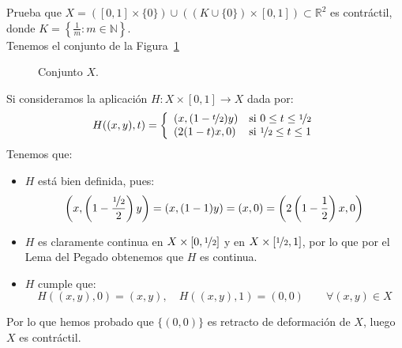 \begin{ejercicio}
    Prueba que $X=([0,1]\times \{0\})\cup ((K\cup \{0\})\times [0,1])\subset \mathbb{R}^2$ es contráctil, donde $K = \left\{\frac{1}{m}:m\in \mathbb{N}\right\}$.\\

    \noindent
    Tenemos el conjunto de la Figura~\ref{fig:12_rel2}
    \begin{figure}[H]
        \centering
        \caption{Conjunto $X$.}
        \label{fig:12_rel2}
    \end{figure}
    \noindent
    Si consideramos la aplicación $H:X\times [0,1]\to X$ dada por:
    \begin{equation*}
        H((x,y),t) = \left\{\begin{array}{ll}
                (x,(1-\nicefrac{t}{2})y)& \text{si\ } 0\leq t\leq \nicefrac{1}{2}\\
                (2(1-t)x,0)& \text{si\ } \nicefrac{1}{2}\leq t\leq 1
        \end{array}\right. 
    \end{equation*}
    Tenemos que:
    \begin{itemize}
        \item $H$ está bien definida, pues:
            \begin{equation*}
                \left(x,\left(1-\frac{\nicefrac{1}{2}}{2}\right)y\right) = (x,(1-1)y) = (x,0) = \left(2\left(1-\frac{1}{2}\right)x,0\right) 
            \end{equation*}
        \item $H$ es claramente continua en $X\times [0,\nicefrac{1}{2}]$ y en $X\times [\nicefrac{1}{2},1]$, por lo que por el Lema del Pegado obtenemos que $H$ es continua.
        \item $H$ cumple que:
            \begin{equation*}
                H((x,y),0) = (x,y),\quad H((x,y),1) = (0,0)\qquad \forall (x,y)\in X
            \end{equation*}
    \end{itemize}
    Por lo que hemos probado que $\{(0,0)\}$ es retracto de deformación de $X$, luego $X$ es contráctil.
\end{ejercicio}

